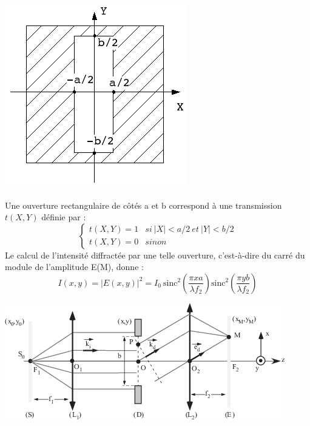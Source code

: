 \documentclass[%
oneside,                 %
final,                   %
10pt,french]{article}
\newenvironment{doconceexercise}{}{}
\newcounter{doconceexercisecounter}
\begin{document}




\begin{doconceexercise}





\vspace{6mm}

\centerline{\includegraphics[width=0.7\linewidth]{figs/Diffr_ouv_rectangle.png}}

\vspace{6mm}



Une ouverture rectangulaire de côtés a et b correspond à une transmission $t(X, Y)$ définie par :
\[ \left\{
\begin{array}{ll}
t(X,Y) = 1 & si \ |X|<a/2 \ et \ |Y|<b/2 \\
t(X,Y) = 0 & sinon
\end{array}
\right. \]
Le calcul de l'intensité diffractée par une telle ouverture, c’est-à-dire du carré du module de l'amplitude E(M), donne :
$$I(x,y)=|E(x,y)|^2=I_0 \  \mathrm{sinc}^2\left(\frac{\pi xa}{\lambda f_2}\right) \mathrm{sinc}^2\left(\frac{\pi yb}{\lambda f_2}\right)$$



\vspace{6mm}

\centerline{\includegraphics[width=0.7\linewidth]{figs/figDiff.png}}


\end{doconceexercise}
\end{document}
